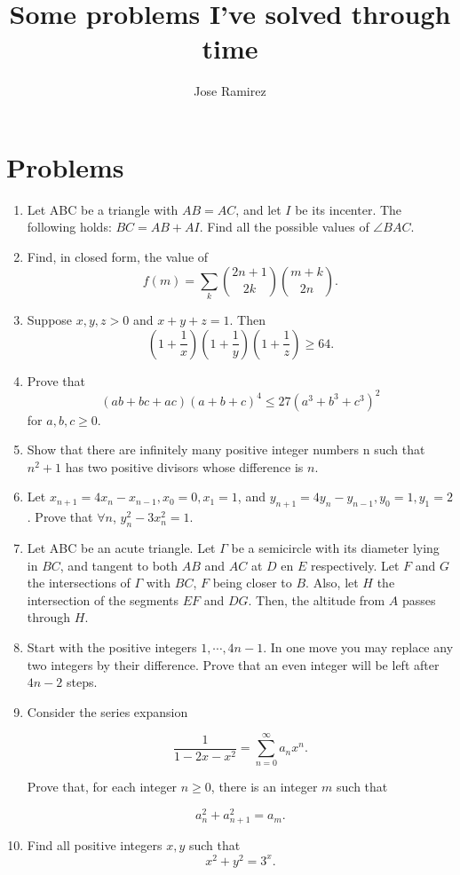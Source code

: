 \documentclass{article}
\title{Some problems I've solved through time}
\author{Jose Ramirez}
\begin{document}
\maketitle

\section{Problems}
\label{sec:Problems}

\begin{enumerate}

\item Let ABC be a triangle with $AB=AC$, and let $I$  be its incenter. The following holds: $BC=AB+AI$. Find all the possible values of $\angle BAC$.

\item Find, in closed form, the value of $$f(m) = \sum_{k} \binom{2n + 1}{2k}\binom{m + k}{2n}.$$

\item Suppose $x, y, z > 0$ and $x + y + z = 1$. Then $$\left(1 + \frac{1}{x}\right)\left(1 + \frac{1}{y}\right)\left(1 + \frac{1}{z}\right) \geq 64.$$

\item Prove that $$(ab + bc + ac)(a + b + c)^4 \leq 27(a^3 + b^3 + c^3)^{2}$$ for $a, b, c \geq 0.$

\item Show that there are infinitely many positive integer numbers n such that $n^2 + 1$ has two positive divisors whose difference is $n$.

\item Let $x_{n + 1} = 4x_{n} - x_{n - 1}, x_0 = 0, x_1 = 1$, and $y_{n + 1} = 4y_{n} - y_{n - 1}, y_0 = 1, y_1 = 2$. Prove that $\forall n$, $y_{n}^2 - 3x_{n}^2 = 1$.

\item Let ABC be an acute triangle. Let $\Gamma$ be a semicircle with its diameter lying in $BC$, and tangent to both $AB$ and $AC$ at $D$ en $E$ respectively. Let $F$ and $G$ the intersections of $\Gamma$ with $BC$, $F$ being closer to $B$. Also, let $H$ the intersection of the segments $EF$ and $DG$. Then, the altitude from $A$ passes through $H$.

\item Start with the positive integers $1, \cdots, 4n - 1$. In one move you may replace any two integers by their difference. Prove that an even integer will be left after $4n - 2$ steps.

\item Consider the series expansion

$$\frac{1}{1 - 2x -x^2} = \sum_{n = 0}^{\infty}a_n x^n.$$

Prove that, for each integer $n \geq 0$, there is an integer $m$ such that

$$a_n^2 + a_{n + 1}^2 = a_m.$$

\item Find all positive integers $x, y$ such that
$$
	x^2 + y^2 = 3^x.
$$

\end{enumerate}
\end{document}

